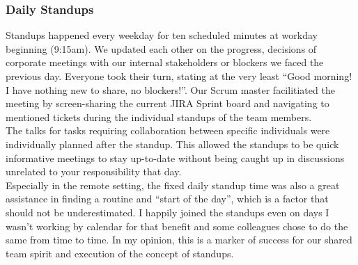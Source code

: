 \documentclass[a4paper]{article}
\begin{document}
\subsubsection{Daily Standups}
Standups happened every weekday for ten scheduled minutes at workday beginning (9:15am). 
We updated each other on the progress, decisions of corporate meetings with our internal stakeholders or blockers we faced the previous day. 
Everyone took their turn, stating at the very least “Good morning! I have nothing new to share, no blockers!”. 
Our Scrum master facilitiated the meeting by screen-sharing the current JIRA Sprint board and navigating to mentioned tickets during the individual standups of the team members. 
\\\linebreak
The talks for tasks requiring collaboration between specific individuals were individually planned after the standup. 
This allowed the standups to be quick informative meetings to stay up-to-date without being caught up in discussions unrelated to your responsibility that day.
\\\linebreak
Especially in the remote setting, the fixed daily standup time was also a great assistance in finding a routine and “start of the day”, which is a factor that should not be underestimated. 
I happily joined the standups even on days I wasn’t working by calendar for that benefit and some colleagues chose to do the same from time to time. 
In my opinion, this is a marker of success for our shared team spirit and execution of the concept of standups.
\end{document}
